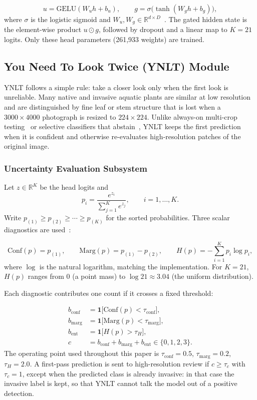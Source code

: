 \documentclass[final,3p,times,twocolumn]{elsarticle}
\begin{document}
\[
u = \mathrm{GELU}(W_u h + b_u), \qquad
g = \sigma\bigl(\tanh(W_g h + b_g)\bigr),
\]
where \(\sigma\) is the logistic sigmoid and \(W_u, W_g \in \mathbb{R}^{d \times D}\)~\cite{HendrycksandGimpel2016}. The gated hidden state is the element-wise product \(u \odot g\), followed by dropout and a linear map to \(K=21\) logits. Only these head parameters (261{,}933 weights) are trained.

\subsection{You Need To Look Twice (YNLT) Module}

YNLT follows a simple rule: take a closer look only when the first look is unreliable. Many native and invasive aquatic plants are similar at low resolution and are distinguished by fine leaf or stem structure that is lost when a $3000\times 4000$ photograph is resized to $224\times 224$. Unlike always-on multi-crop testing~\cite{krizhevsky2012imagenet} or selective classifiers that abstain~\cite{geifman2017selective}, YNLT keeps the first prediction when it is confident and otherwise re-evaluates high-resolution patches of the original image.

\subsubsection{Uncertainty Evaluation Subsystem}

Let \(z \in \mathbb{R}^{K}\) be the head logits and
\[
p_i = \frac{e^{z_i}}{\sum_{j=1}^{K} e^{z_j}}, \qquad i=1,\ldots,K.
\]
Write \(p_{(1)}\ge p_{(2)}\ge \cdots \ge p_{(K)}\) for the sorted probabilities. Three scalar diagnostics are used~\cite{Guoetal2017, Ovadiaetal2019, hendrycks2017baseline}:

\[
\mathrm{Conf}(p) = p_{(1)}, \qquad
\mathrm{Marg}(p) = p_{(1)}-p_{(2)}, \qquad
H(p) = -\sum_{i=1}^{K} p_i \log p_i,
\]
where \(\log\) is the natural logarithm, matching the implementation. For \(K=21\), \(H(p)\) ranges from \(0\) (a point mass) to \(\log 21 \approx 3.04\) (the uniform distribution).

Each diagnostic contributes one count if it crosses a fixed threshold:

\[
\begin{aligned}
b_{\mathrm{conf}} &= \mathbf{1}\bigl[\mathrm{Conf}(p) < \tau_{\mathrm{conf}}\bigr], \\
b_{\mathrm{marg}} &= \mathbf{1}\bigl[\mathrm{Marg}(p) < \tau_{\mathrm{marg}}\bigr], \\
b_{\mathrm{ent}}  &= \mathbf{1}\bigl[H(p) > \tau_{H}\bigr], \\
c &= b_{\mathrm{conf}} + b_{\mathrm{marg}} + b_{\mathrm{ent}} \in \{0,1,2,3\}.
\end{aligned}
\]
The operating point used throughout this paper is \(\tau_{\mathrm{conf}}=0.5\), \(\tau_{\mathrm{marg}}=0.2\), \(\tau_{H}=2.0\). A first-pass prediction is sent to high-resolution review if \(c \ge \tau_{c}\) with \(\tau_{c}=1\), except when the predicted class is already invasive: in that case the invasive label is kept, so that YNLT cannot talk the model out of a positive detection.
\end{document}
